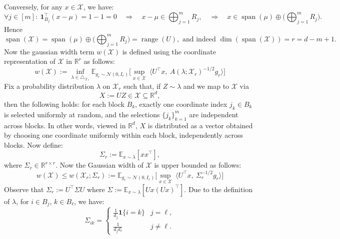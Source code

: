Conversely, for any \(x\in \mathcal X\), we have:
\begin{equation}\label{eq:span-inclusion-2}
\forall j\in[m]:\ \mathbf 1_{B_j}^\top(x-\mu)=1-1=0
\quad\Rightarrow\quad x-\mu\in \bigoplus_{j=1}^m R_j,
\quad\Rightarrow\quad x\in \operatorname{span}(\mu)\oplus\Big(\bigoplus_{j=1}^m R_j\Big).\nonumber
\end{equation}
Hence
\begin{equation}\label{eq:spanX-rangeU}
\operatorname{span}(\mathcal X)=\operatorname{span}(\mu)\oplus\Big(\bigoplus_{j=1}^m R_j\Big)
=\operatorname{range}(U),\text{ and indeed } \dim(\operatorname{span}(\mathcal X))=r=d-m+1.\nonumber
\end{equation}
Now the gaussian width term $w(\mathcal{X})$ is defined using the coordinate representation of $\mathcal X$ in $\mathbb R^r$ as follows:
\[
w(\mathcal{X}):=\inf_{\lambda\in\triangle_{\mathcal{X}_r}}\mathbb E_{g_r\sim \mathcal{N}(0,I_r)}\Big[\sup_{x\in \mathcal{X}}\ \langle U^\top x,\ A(\lambda;\mathcal{X}_r)^{-1/2}g_r\rangle\Big]
\]
Fix a probability distribution $\lambda$ on $\mathcal X_r$ such that, if $Z\sim\lambda$ and we map to $\mathcal X$ via
\[
X := UZ \in \mathcal X \subseteq \mathbb R^d,
\]
then the following holds: for each block $B_k$, exactly one coordinate index $j_k \in B_k$ is selected uniformly at random, and the selections $\{j_k\}_{k=1}^m$ are independent across blocks. In other words, viewed in $\mathbb R^d$, $X$ is distributed as a vector obtained by choosing one coordinate uniformly within each block, independently across blocks.  Now define:
\begin{equation}\label{eq:sigma-def}
\Sigma_r:=\mathbb E_{x\sim\lambda}[xx^\top],\nonumber
\end{equation}
where $\Sigma_r\in \mathbb{R}^{r\times r}$. Now the Gaussian width of $\mathcal{X}$ is upper bounded as follows:
\begin{equation}\label{eq:gaussian-width}
w(\mathcal{X})\leq w(\mathcal{X}_r;\Sigma_r):=\mathbb E_{g_r\sim \mathcal{N}(0,I_r)}\Big[\sup_{x\in \mathcal{X}}\ \langle U^\top x,\ \Sigma_r^{-1/2}g_r\rangle\Big]\nonumber
\end{equation}
Observe that \(\Sigma_r := U^\top \Sigma U\) where $\Sigma:=\mathbb{E}_{x\sim\lambda}[Ux(Ux)^\top]$. Due to the definition of $\lambda$, for \(i\in B_j\), \(k\in B_\ell\), we have:
\begin{equation}\label{eq:Sigma-entries}
\Sigma_{ik}=
\begin{cases}
\frac1{d_j}\mathbf 1\{i=k\} & j=\ell,\\[3pt]
\frac1{d_j d_\ell} & j\neq \ell.
\end{cases}\nonumber
\end{equation}
